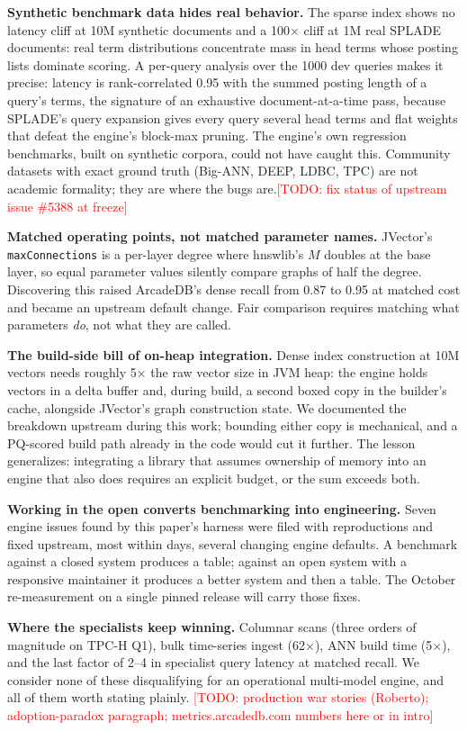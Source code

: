 \documentclass[conference]{IEEEtran}
\newcommand{\todo}[1]{\textcolor{red}{[TODO: #1]}}
\newcommand{\arcadedb}{ArcadeDB}
\begin{document}
\textbf{Synthetic benchmark data hides real behavior.} The sparse index shows
no latency cliff at 10M synthetic documents and a 100$\times$ cliff at 1M
real SPLADE documents: real term distributions concentrate mass in head terms
whose posting lists dominate scoring. A per-query analysis over the 1000 dev
queries makes it precise: latency is rank-correlated 0.95 with the summed
posting length of a query's terms, the signature of an exhaustive
document-at-a-time pass, because SPLADE's query expansion gives every query
several head terms and flat weights that defeat the engine's block-max
pruning. The engine's own regression benchmarks, built on synthetic corpora,
could not have caught this. Community datasets with exact ground truth
(Big-ANN, DEEP, LDBC, TPC) are not academic formality; they are where the
bugs are.\todo{fix status of upstream issue \#5388 at freeze}

\textbf{Matched operating points, not matched parameter names.} JVector's
\texttt{maxConnections} is a per-layer degree where hnswlib's $M$ doubles at
the base layer, so equal parameter values silently compare graphs of half the
degree. Discovering this raised \arcadedb{}'s dense recall from 0.87 to 0.95
at matched cost and became an upstream default change. Fair comparison
requires matching what parameters \emph{do}, not what they are called.

\textbf{The build-side bill of on-heap integration.} Dense index construction
at 10M vectors needs roughly 5$\times$ the raw vector size in JVM heap: the
engine holds vectors in a delta buffer and, during build, a second boxed copy
in the builder's cache, alongside JVector's graph construction state. We
documented the breakdown upstream during this work; bounding either copy is
mechanical, and a PQ-scored build path already in the code would cut it
further. The lesson generalizes: integrating a library that assumes
ownership of memory into an engine that also does requires an explicit
budget, or the sum exceeds both.

\textbf{Working in the open converts benchmarking into engineering.} Seven
engine issues found by this paper's harness were filed with reproductions and
fixed upstream, most within days, several changing engine defaults. A
benchmark against a closed system produces a table; against an open system
with a responsive maintainer it produces a better system and then a table.
The October re-measurement on a single pinned release will carry those fixes.

\textbf{Where the specialists keep winning.} Columnar scans (three orders of
magnitude on TPC-H Q1), bulk time-series ingest (62$\times$), ANN build
time (5$\times$), and the last factor of 2--4 in specialist query latency at
matched recall. We consider none of these disqualifying for an operational
multi-model engine, and all of them worth stating plainly.
\todo{production war stories (Roberto); adoption-paradox paragraph;
metrics.arcadedb.com numbers here or in intro}
\end{document}
